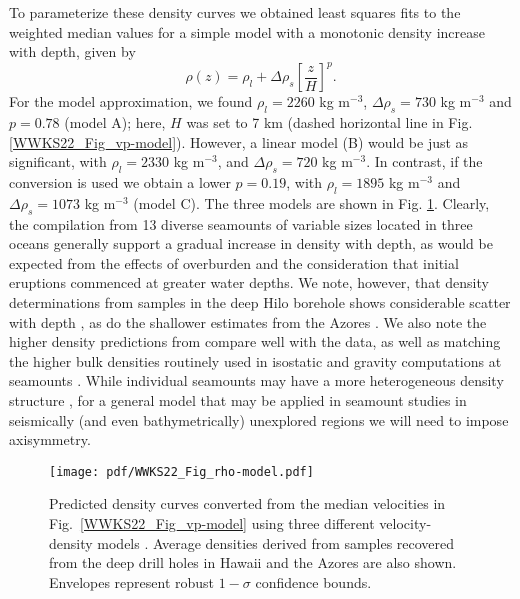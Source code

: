 To parameterize these density curves we obtained least squares fits to the weighted median values for a simple model with a
monotonic density increase with depth, given by
\begin{equation*}
\rho(z) = \rho_l + \Delta \rho_s \left [ \frac{z}{H} \right ]^p.
\end{equation*}
For the \citet{B2005} model approximation, we found $\rho_l = 2260$ kg m$^{-3}$, $\Delta \rho_s = 730$ kg m$^{-3}$ and $p = 0.78$ (model A);
here, $H$ was set to 7 km (dashed horizontal line in Fig. \ref{WWKS22_Fig_vp-model}). However, a linear model (B) would be just as significant, with
$\rho_l = 2330$ kg m$^{-3}$, and $\Delta \rho_s = 720$ kg m$^{-3}$. In contrast, if the \citet{CR1984} conversion is used we
obtain a lower $p = 0.19$, with $\rho_l = 1895$ kg m$^{-3}$ and $\Delta \rho_s = 1073$ kg m$^{-3}$ (model C).
The three models are shown in Fig. \ref{WWKS22_Fig_rho-model}.
Clearly, the compilation from 13 diverse seamounts of variable sizes located in three oceans generally support a gradual
increase in density with depth, as would be expected from the effects of overburden and the consideration that initial
eruptions commenced at greater water depths. We note, however, that density determinations from samples in the deep Hilo
borehole shows considerable scatter with depth \citep{JM2001}, as do the shallower estimates from the Azores \citep{H1979}.
We also note the higher density predictions from \citet{CR1984} compare well with the data, as well as matching the higher
bulk densities routinely used in isostatic and gravity computations at seamounts \citep[e.g.,~][]{WSSW06}.
While individual seamounts may have a more heterogeneous density structure \citep[e.g.,~][]{EMH05,H1991}, for a general model
that may be applied in seamount studies in seismically (and even bathymetrically) unexplored regions we will need to impose axisymmetry.

\begin{figure}
\centering
\texttt{[image: pdf/WWKS22\_Fig\_rho-model.pdf]}
\caption{Predicted density curves converted from the median velocities in Fig.~\ref{WWKS22_Fig_vp-model} using three different
velocity-density models \citep{B2005,LND70,CR1984}. Average densities derived from samples recovered from the deep drill holes
in Hawaii \citep{JM2001} and the Azores \citep{H1979} are also shown. Envelopes represent robust $1-\sigma$ confidence bounds.}
\label{WWKS22_Fig_rho-model}
\end{figure}

